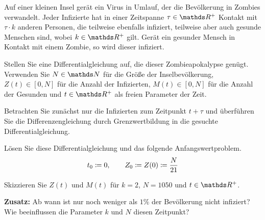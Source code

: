 \begin{atiTask}[
	title = Eine Zombieapokalypse,
	language = Deutsch
]
	Auf einer kleinen Insel gerät ein Virus in Umlauf, der die Bevölkerung in Zombies verwandelt.
	Jeder Infizierte hat in einer Zeitspanne $\tau\in\setR^+$ Kontakt mit $\tau\cdot k$ anderen Personen, die teilweise ebenfalls infiziert, teilweise aber auch gesunde Menschen sind, wobei $k\in\setR^+$ gilt.
	Gerät ein gesunder Mensch in Kontakt mit einem Zombie, so wird dieser infiziert.
	\medskip
	\begin{atiSubtasks}
		\item{
			Stellen Sie eine Differentialgleichung auf, die dieser Zombieapokalypse genügt.
			Verwenden Sie $N\in\setN$ für die Größe der Inselbevölkerung, $Z(t)\in[0,N]$ für die Anzahl der Infizierten, $M(t)\in[0,N]$ für die Anzahl der Gesunden und $t\in\setR^+$ als freien Parameter der Zeit.

			\begin{atiNote}
				Betrachten Sie zunächst nur die Infizierten zum Zeitpunkt $t+\tau$ und überführen Sie die Differenzengleichung durch Grenzwertbildung in die gesuchte Differentialgleichung.
			\end{atiNote}
		}
		\item{
			Lösen Sie diese Differentialgleichung und das folgende Anfangswertproblem.
			\[
				t_0\coloneqq 0,\qquad Z_0\coloneqq Z(0) \coloneqq \frac{N}{21}
			\]
		}
		\item{
			Skizzieren Sie $Z(t)$ und $M(t)$ für $k=2$, $N=1050$ und $t\in\setR^+$.
		}
		\item{
			\textbf{Zusatz:} Ab wann ist nur noch weniger als $1\unit{\%}$ der Bevölkerung nicht infiziert?
			Wie beeinflussen die Parameter $k$ und $N$ diesen Zeitpunkt?
		}
	\end{atiSubtasks}
\end{atiTask}